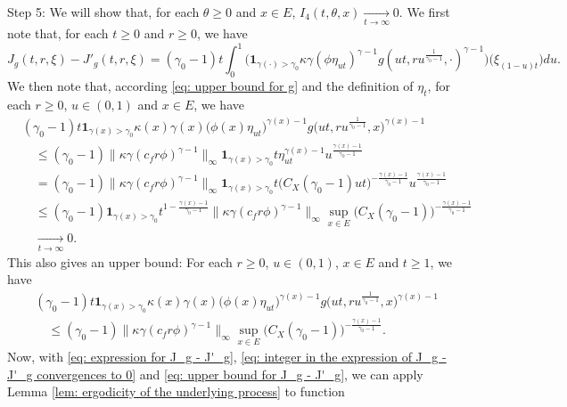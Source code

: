 \documentclass[12pt, a4paper]{amsart}
\theoremstyle{definition}
\numberwithin{equation}{section}
\begin{document}
	Step 5: We will show that, for each $\theta \geq 0$ and $x\in E$, $I_4(t,\theta,x) \xrightarrow[t\to \infty]{} 0$.
	We first note that, for each $t\geq 0$ and $r\geq 0$, we have
\[\label{eq: expression for J_g - J'_g}
	J_g(t,r,\xi) - J'_g(t,r,\xi)
	= (\gamma_0 - 1)t\int_0^1 \big( \mathbf 1_{\gamma(\cdot )> \gamma_0}  \kappa\gamma (   \phi \eta_{ut}   )^{\gamma - 1} g (ut,ru^{\frac{1}{\gamma_0 - 1}},\cdot )^{\gamma-1}  \big) \big(  \xi_{(1-u)t}  \big) du.
\]
	We then note that, according \eqref{eq: upper bound for g} and the definition of $\eta_t$, for each $r\geq 0$, $u\in (0,1)$ and $x\in E$, we have
\[\label{eq: integer in the expression of J_g - J'_g convergences to 0}\begin{split}
	&(\gamma_0 - 1)t  \mathbf 1_{\gamma(x)> \gamma_0}  \kappa(x)\gamma(x) \big(   \phi(x) \eta_{ut}   \big)^{\gamma(x) - 1} g \big(ut,ru^{\frac{1}{\gamma_0 - 1}},x \big)^{\gamma(x)-1}
	\\&\quad \leq (\gamma_0 - 1) \big\| \kappa \gamma (c_f r\phi)^{\gamma - 1}\big\|_\infty \mathbf 1_{\gamma(x) > \gamma_0} t \eta_{ut}^{\gamma(x) - 1} u^{\frac{\gamma(x) - 1}{\gamma_0 - 1}}
	\\&\quad = (\gamma_0 - 1) \big\| \kappa \gamma (c_f r\phi)^{\gamma - 1}\big\|_\infty \mathbf 1_{\gamma(x) > \gamma_0} t \big( C_X(\gamma_0 - 1) ut\big)^{-\frac{\gamma(x) - 1}{\gamma_0 - 1}} u^{\frac{\gamma(x) - 1}{\gamma_0 - 1}}
	\\&\quad \leq (\gamma_0 - 1) \mathbf 1_{\gamma(x) > \gamma_0} t^{1-\frac{\gamma(x) - 1}{\gamma_0 - 1}}\big\| \kappa \gamma (c_f r\phi)^{\gamma - 1}\big\|_\infty \sup_{x\in E} \big( C_X(\gamma_0 - 1) \big)^{-\frac{\gamma(x) - 1}{\gamma_0 - 1}}
	\\&\quad \xrightarrow[t\to \infty]{} 0.
\end{split}\]
	This also gives an upper bound: For each $r\geq 0$, $u \in (0,1)$, $x\in E$ and $t\geq 1$, we have
\[\label{eq: upper bound for the integrator of J_g - J'_g} \begin{split}
	&(\gamma_0 - 1)t  \mathbf 1_{\gamma(x)> \gamma_0}  \kappa(x)\gamma(x) \big(   \phi(x) \eta_{ut}   \big)^{\gamma(x) - 1} g \big(ut,ru^{\frac{1}{\gamma_0 - 1}},x \big)^{\gamma(x)-1}
	\\&\quad \leq (\gamma_0 - 1) \big\| \kappa \gamma (c_f r\phi)^{\gamma - 1}\big\|_\infty \sup_{x\in E} \big( C_X(\gamma_0 - 1) \big)^{-\frac{\gamma(x) - 1}{\gamma_0 - 1}}.
\end{split}\]
	Now, with \eqref{eq: expression for J_g - J'_g}, \eqref{eq: integer in the expression of J_g - J'_g convergences to 0} and \eqref{eq: upper bound for J_g - J'_g}, we can apply Lemma \ref{lem: ergodicity of the underlying process} to function
\end{document}
